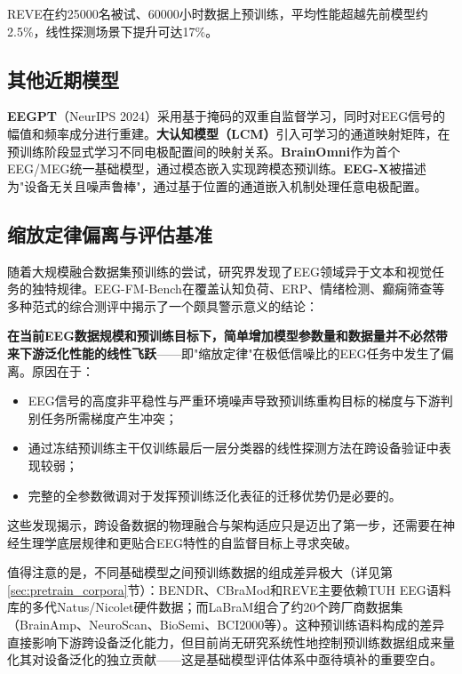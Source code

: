 \documentclass[12pt, a4paper]{article}
\begin{document}
REVE在约25000名被试、60000小时数据上预训练，平均性能超越先前模型约2.5\%，线性探测场景下提升可达17\%。

\subsection{其他近期模型}

\textbf{EEGPT}（NeurIPS 2024）\citep{EEGPT2024}采用基于掩码的双重自监督学习，同时对EEG信号的幅值和频率成分进行重建。\textbf{大认知模型（LCM）}\citep{LCM2025}引入可学习的通道映射矩阵，在预训练阶段显式学习不同电极配置间的映射关系。\textbf{BrainOmni}\citep{BrainOmni2025}作为首个EEG/MEG统一基础模型，通过模态嵌入实现跨模态预训练。\textbf{EEG-X}\citep{EEGX2025}被描述为"设备无关且噪声鲁棒"，通过基于位置的通道嵌入机制处理任意电极配置。

\subsection{缩放定律偏离与评估基准}

随着大规模融合数据集预训练的尝试，研究界发现了EEG领域异于文本和视觉任务的独特规律。EEG-FM-Bench\citep{EEGFMBench2025}在覆盖认知负荷、ERP、情绪检测、癫痫筛查等多种范式的综合测评中揭示了一个颇具警示意义的结论：

\textbf{在当前EEG数据规模和预训练目标下，简单增加模型参数量和数据量并不必然带来下游泛化性能的线性飞跃}——即"缩放定律"在极低信噪比的EEG任务中发生了偏离\citep{EEGFMworth2024}。原因在于：

\begin{itemize}
  \item EEG信号的高度非平稳性与严重环境噪声导致预训练重构目标的梯度与下游判别任务所需梯度产生冲突；
  \item 通过冻结预训练主干仅训练最后一层分类器的线性探测方法在跨设备验证中表现较弱；
  \item 完整的全参数微调对于发挥预训练泛化表征的迁移优势仍是必要的。
\end{itemize}

这些发现揭示，跨设备数据的物理融合与架构适应只是迈出了第一步，还需要在神经生理学底层规律和更贴合EEG特性的自监督目标上寻求突破。

值得注意的是，不同基础模型之间预训练数据的组成差异极大（详见第\ref{sec:pretrain_corpora}节）：BENDR\citep{Kostas2021BENDR}、CBraMod\citep{Wang2025CBraMod}和REVE\citep{ElOuahidi2025REVE}主要依赖TUH EEG语料库的多代Natus/Nicolet硬件数据；而LaBraM\citep{Jiang2024LaBraM}组合了约20个跨厂商数据集（BrainAmp、NeuroScan、BioSemi、BCI2000等）。这种预训练语料构成的差异直接影响下游跨设备泛化能力，但目前尚无研究系统性地控制预训练数据组成来量化其对设备泛化的独立贡献——这是基础模型评估体系中亟待填补的重要空白。
\end{document}
